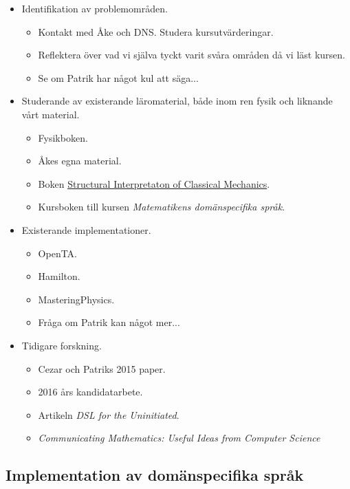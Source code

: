 \documentclass[12pt,a4paper]{article}
\begin{document}
\begin{itemize}
    \item Identifikation av problemområden.
        \begin{itemize}
            \item Kontakt med Åke och DNS. Studera kursutvärderingar.
            \item Reflektera över vad vi själva tyckt varit svåra områden då vi läst kursen.
            \item Se om Patrik har något kul att säga...
        \end{itemize}
    \item Studerande av existerande läromaterial, både inom ren fysik och liknande vårt material.
        \begin{itemize}
            \item Fysikboken.
            \item Åkes egna material.
            \item Boken \href{http://case.edu/artsci/math/wells/pub/pdf/commath.pdf}{Structural Interpretaton of Classical Mechanics}.
            \item Kursboken till kursen \textit{Matematikens domänspecifika språk}.
        \end{itemize}
    \item Existerande implementationer.
        \begin{itemize}
            \item OpenTA.
            \item Hamilton.
            \item MasteringPhysics.
            \item Fråga om Patrik kan något mer...
        \end{itemize}
    \item Tidigare forskning.
        \begin{itemize}
            \item Cezar och Patriks 2015 paper.
            \item 2016 års kandidatarbete.
            \item Artikeln \textit{DSL for the Uninitiated}.
            \item \textit{Communicating Mathematics: Useful Ideas from Computer Science}
        \end{itemize}
\end{itemize}

\subsection{Implementation av domänspecifika språk}
\end{document}
